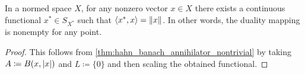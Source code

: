 \begin{corollary}\label{thm:hahn_banach_duality_mapping}\cite[25]{Йоффе1974}
  In a normed space \( X \), for any nonzero vector \( x \in X \) there exists a continuous functional \( x^* \in S_{X^*} \) such that \( \left\langle x^*, x \right\rangle = \left\Vert x \right\Vert \). In other words, the duality mapping is nonempty for any point.
\end{corollary}
\begin{proof}
  This follows from \cref{thm:hahn_banach_annihilator_nontrivial} by taking \( A \coloneqq B(x, \left\vert x \right\vert) \) and \( L \coloneqq \{ 0 \} \) and then scaling the obtained functional.
\end{proof}
